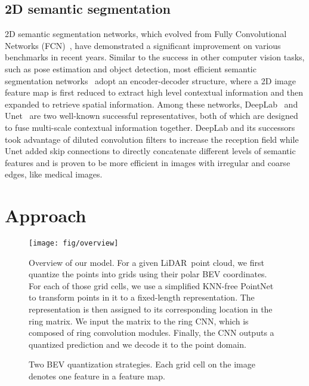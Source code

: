 \documentclass[10pt,twocolumn,letterpaper]{article}
\newcommand{\lidar}{\mbox{LiDAR }}
\begin{document}
\subsection{2D semantic segmentation}
2D semantic segmentation networks, which evolved from Fully Convolutional Networks (FCN)~\cite{long2015fully}, have demonstrated a significant improvement on various benchmarks in recent years. Similar to the success in other computer vision tasks, such as pose estimation and object detection, most efficient semantic segmentation networks~\cite{Yu2017} adopt an encoder-decoder structure, where a 2D image feature map is first reduced to extract high level contextual information and then expanded to retrieve spatial information. Among these networks, DeepLab~\cite{chen2014semantic} and Unet~\cite{ronneberger2015u} are two well-known successful representatives, both of which are designed to fuse multi-scale contextual information together. DeepLab and its successors~\cite{chen2017rethinking,chen2018encoder} took advantage of diluted convolution filters to increase the reception field while Unet added skip connections to directly concatenate different levels of semantic features and is proven to be more efficient in images with irregular and coarse edges, like medical images. 
\section{Approach}

\begin{figure*}
  \centering
  \texttt{[image: fig/overview]}
  \caption{Overview of our model. For a given \lidar point cloud, we first quantize the points into grids using their polar BEV coordinates. For each of those grid cells, we use a simplified KNN-free PointNet to transform points in it to a fixed-length representation. The representation is then assigned to its corresponding location in the ring matrix. We input the matrix to the ring CNN, which is composed of ring convolution modules. Finally, the CNN outputs a quantized prediction and we decode it to the point domain.}
  \label{fig:overview}
  \vspace{-15pt}
\end{figure*}

\begin{figure}[htbp]
\centering
{}
\quad
{}
\quad
\caption{Two BEV quantization strategies. Each grid cell on the image denotes one feature in a feature map.}
\vspace{-15pt}
\label{fig.bev}
\end{figure}
\end{document}
